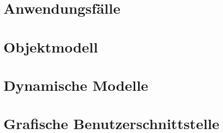 \section{Anwendungsfälle}

%
%
%
%
%

\section{Objektmodell}
\section{Dynamische Modelle}
\section{Grafische Benutzerschnittstelle}